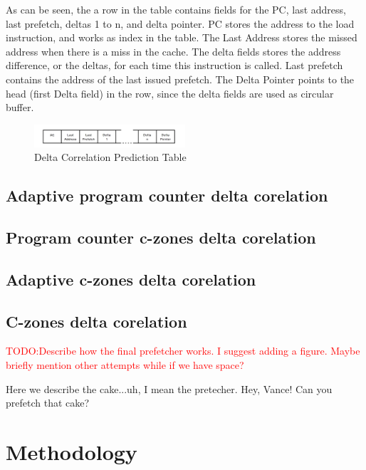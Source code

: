 \documentclass[a4paper]{IEEEtran}
\newcommand\TODO[1]{\textcolor{red}{TODO:#1}}
\newcommand\todo[1]{\TODO{#1}}
\begin{document}
As can be seen, the a row in the table contains fields for the PC, last address, last prefetch, deltas 1 to n, and delta pointer.
PC stores the address to the load instruction, and works as index in the table.
The Last Address stores the missed address when there is a miss in the cache.
The delta fields stores the address difference, or the deltas, for each time this instruction is called.
Last prefetch contains the address of the last issued prefetch.
The Delta Pointer points to the head (first Delta field) in the row, since the delta fields are used as circular buffer.

\begin{figure}[h!]
  \centering
      \includegraphics[width=0.5\textwidth]{Figures/DCTable}
  \caption{Delta Correlation Prediction Table}
  \label{fig:DCTable}
\end{figure}

\subsection{Adaptive program counter delta corelation}

\subsection{Program counter c-zones delta corelation}

\subsection{Adaptive c-zones delta corelation}

\subsection{C-zones delta corelation}


\todo{Describe how the final prefetcher works. I suggest adding a figure. Maybe briefly mention other attempts while if we have space?}



Here we describe the cake...uh, I mean the pretecher. Hey, Vance! Can you prefetch that cake?

\section{Methodology}
\end{document}
